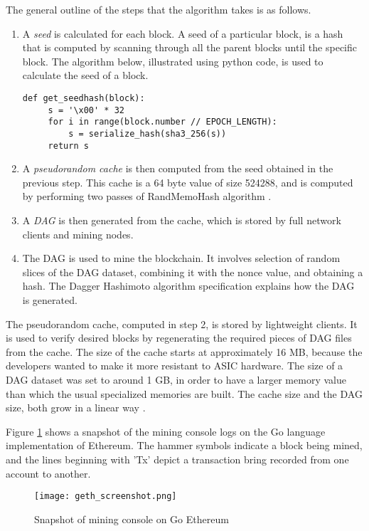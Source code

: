 \documentclass[english]{tktltiki}
\begin{document}
The general outline of the steps that the algorithm takes is as follows.
\begin{enumerate}
\item A \textit{seed} is calculated for each block. A seed of a particular block, is a hash that is computed by scanning through all the parent blocks until the specific block. The algorithm below, illustrated using python code, is used to calculate the seed of a block.
\begin{verbatim}
def get_seedhash(block):
     s = '\x00' * 32
     for i in range(block.number // EPOCH_LENGTH):
         s = serialize_hash(sha3_256(s))
     return s
\end{verbatim}
\item A \textit{pseudorandom cache} is then computed from the seed obtained in the previous step. This cache is a 64 byte value of size 524288, and is computed by performing two passes of RandMemoHash algorithm \cite{pseudorandom-cache}. 

\item A \textit{DAG} is then generated from the cache, which is stored by full network clients and mining nodes. 
\item The DAG is used to mine the blockchain. It involves selection of random slices of the DAG dataset, combining it with the nonce value, and obtaining a hash. The Dagger Hashimoto algorithm specification explains how the DAG is generated.
\end{enumerate}

The pseudorandom cache, computed in step 2, is stored by lightweight clients. It is used to verify desired blocks by regenerating the required pieces of DAG files from the cache. The size of the cache starts at approximately 16 MB, because the developers wanted to make it more resistant to ASIC hardware. The size of a DAG dataset was set to around 1 GB, in order to have a larger memory value than which the usual specialized memories are built. The cache size and the DAG size, both grow in a linear way \cite{ethash}.

Figure \ref{geth_snapshot} shows a snapshot of the mining console logs on the Go language implementation of Ethereum. The hammer symbols indicate a block being mined, and the lines beginning with 'Tx' depict a transaction bring recorded from one account to another.\newline

\begin{figure}[H]
\begin{center}
\texttt{[image: geth\_screenshot.png]}
\caption{Snapshot of mining console on Go Ethereum}
\label{geth_snapshot}
\end{center}
\end{figure}
\end{document}
